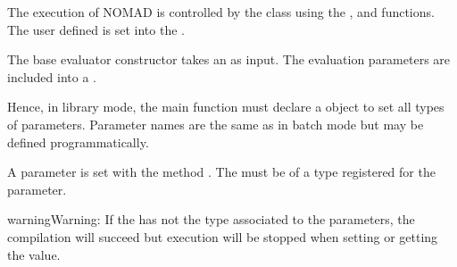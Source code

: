 \documentclass[letterpaper,10pt,english]{sphinxmanual}
\begin{document}
\begin{sphinxVerbatim}[commandchars=\\\{\}]

\end{sphinxVerbatim}

\sphinxAtStartPar
The execution of NOMAD is controlled by the  class using the ,  and  functions.
The user defined  is set into the .

\sphinxAtStartPar
The base evaluator constructor takes an  as input.
The evaluation parameters are included into a .

\sphinxAtStartPar
Hence, in library mode, the main function must declare a  object to set all types of parameters.
Parameter names are the same as in batch mode but may be defined programmatically.

\sphinxAtStartPar
A parameter  is set with the method .
The  must be of a type registered for the  parameter.

\begin{sphinxadmonition}{warning}{Warning:}
\sphinxAtStartPar
If the  has not the type associated to the  parameters, the compilation
will succeed but execution will be stopped when setting or getting the value.
\end{sphinxadmonition}
\end{document}
